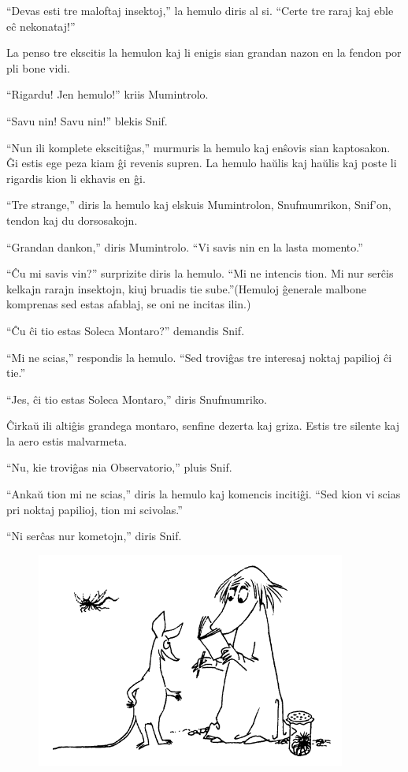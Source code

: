 ``Devas esti tre maloftaj insektoj,'' la hemulo diris al si. ``Certe tre raraj kaj eble eĉ nekonataj!''

La penso tre ekscitis la hemulon kaj li enigis sian grandan nazon en la fendon por pli bone vidi.

``Rigardu! Jen hemulo!'' kriis Mumintrolo.

``Savu nin! Savu nin!'' blekis Snif.

``Nun ili komplete ekscitiĝas,'' murmuris la hemulo kaj enŝovis sian kaptosakon. Ĝi estis ege peza kiam ĝi revenis supren. La hemulo haŭlis kaj haŭlis kaj poste li rigardis kion li ekhavis en ĝi.

``Tre strange,'' diris la hemulo kaj elskuis Mumintrolon, Snufmumrikon, Snif'on, tendon kaj du dorsosakojn.

``Grandan dankon,'' diris Mumintrolo. ``Vi savis nin en la lasta momento.''

``Ĉu mi savis vin?'' surprizite diris la hemulo. ``Mi ne intencis tion. Mi nur serĉis kelkajn rarajn insektojn, kiuj bruadis tie sube.''(Hemuloj ĝenerale malbone komprenas sed estas afablaj, se oni ne incitas ilin.)

``Ĉu ĉi tio estas Soleca Montaro?'' demandis Snif.

``Mi ne scias,'' respondis la hemulo. ``Sed troviĝas tre interesaj noktaj papilioj ĉi tie.''

``Jes, ĉi tio estas Soleca Montaro,'' diris Snufmumriko.

Ĉirkaŭ ili altiĝis grandega montaro, senfine dezerta kaj griza. Estis tre silente kaj la aero estis malvarmeta.

``Nu, kie troviĝas nia Observatorio,'' pluis Snif.

``Ankaŭ tion mi ne scias,'' diris la hemulo kaj komencis incitiĝi. ``Sed kion vi scias pri noktaj papilioj, tion mi scivolas.''

``Ni serĉas nur kometojn,'' diris Snif.

\begin{figure}[htbp]
\centering
\includegraphics[width=290pt,height=200pt]{3-12.png}
\caption{}
\label{3-12}
\end{figure}

